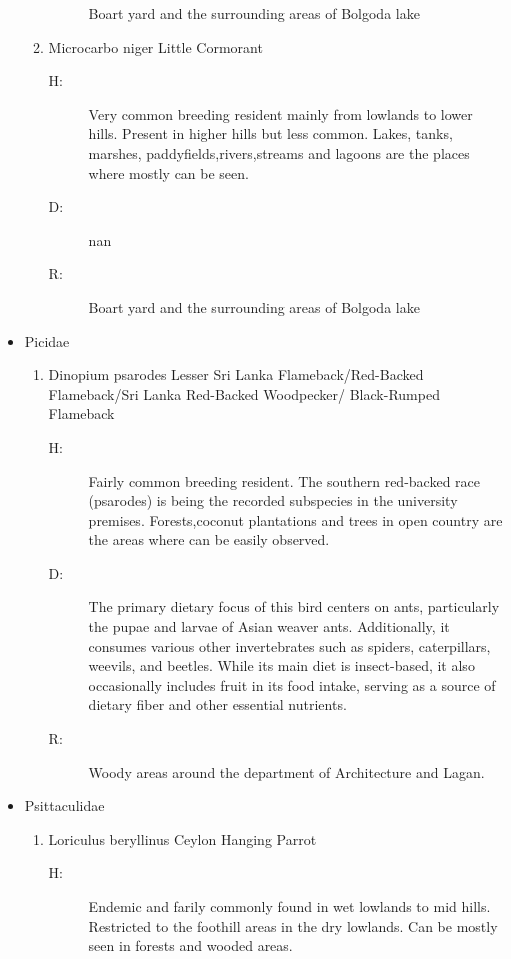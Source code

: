 \begin{itemize}
\begin{enumerate}
\begin{description}
Boart yard and the surrounding areas of Bolgoda lake%
\end{description}%
\item%
Microcarbo niger\newline%
Little Cormorant%
\begin{description}%
\item[H: ]%
Very common breeding resident mainly from lowlands to lower hills. Present in higher hills but less common. Lakes, tanks, marshes, paddyfields,rivers,streams and lagoons are the places where mostly can be seen.%
\item[D: ]%
nan%
\item[R: ]%
Boart yard and the surrounding areas of Bolgoda lake%
\end{description}%
\end{enumerate}%
\item%
Picidae%
\begin{enumerate}%
\item%
Dinopium psarodes\newline%
Lesser Sri Lanka Flameback/Red{-}Backed Flameback/Sri Lanka Red{-}Backed Woodpecker/ Black{-}Rumped Flameback%
\begin{description}%
\item[H: ]%
Fairly common breeding resident. The southern red{-}backed race (psarodes) is being the recorded subspecies in the university premises. Forests,coconut plantations and trees in open country are the areas where can be easily observed.%
\item[D: ]%
The primary dietary focus of this bird centers on ants, particularly the pupae and larvae of Asian weaver ants. Additionally, it consumes various other invertebrates such as spiders, caterpillars, weevils, and beetles. While its main diet is insect{-}based, it also occasionally includes fruit in its food intake, serving as a source of dietary fiber and other essential nutrients.%
\item[R: ]%
Woody areas around the department of Architecture and Lagan.%
\end{description}%
\end{enumerate}%
\item%
Psittaculidae%
\begin{enumerate}%
\item%
Loriculus beryllinus\newline%
Ceylon Hanging Parrot%
\begin{description}%
\item[H: ]%
Endemic and farily commonly found in wet lowlands to mid hills. Restricted to the foothill areas in the dry lowlands. Can be mostly seen in forests and wooded areas.%

\end{description}
\end{enumerate}
\end{itemize}
